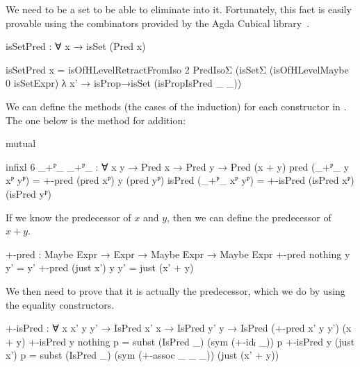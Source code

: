 We need  to be a set to be able to eliminate into it.
Fortunately, this fact is easily provable using the combinators provided by the
Agda Cubical library~\cite{agda-cubical}.
\begin{code}
  isSetPred : ∀ x → isSet (Pred x)
\end{code}
\begin{code}[hide]
  isSetPred x =
    isOfHLevelRetractFromIso 2 PredIsoΣ
      (isSetΣ (isOfHLevelMaybe 0 isSetExpr) λ x' →
        isProp→isSet (isPropIsPred _ _))
\end{code}

We can define the methods (the cases of the induction) for each constructor in
. The one below is the method for addition:
\begin{code}[hide]
  mutual
\end{code}
\begin{code}
    infixl 6 _+ᴾ_
    _+ᴾ_ : ∀ {x y} → Pred x → Pred y → Pred (x + y)
    pred    (_+ᴾ_ {y}  xᴾ yᴾ) = +-pred (pred xᴾ) y (pred yᴾ)
    isPred  (_+ᴾ_      xᴾ yᴾ) = +-isPred (isPred xᴾ) (isPred yᴾ)
\end{code}
If we know the predecessor of $x$ and $y$, then we can define the predecessor of
$x + y$.
\begin{code}
    +-pred :
      Maybe Expr → Expr → Maybe Expr → Maybe Expr
    +-pred nothing    y y' = y'
    +-pred (just x')  y y' = just (x' + y)
\end{code}
We then need to prove that it is actually the predecessor, which we do by using
the equality constructors.
\begin{code}
    +-isPred :
      ∀ {x x' y y'} → IsPred x' x → IsPred y' y →
      IsPred (+-pred x' y y') (x + y)
    +-isPred {y} nothing    p = subst (IsPred _) (sym (+-idₗ _)) p
    +-isPred {y} (just x')  p =
      subst (IsPred _) (sym (+-assoc _ _ _)) (just (x' + y))
\end{code}

